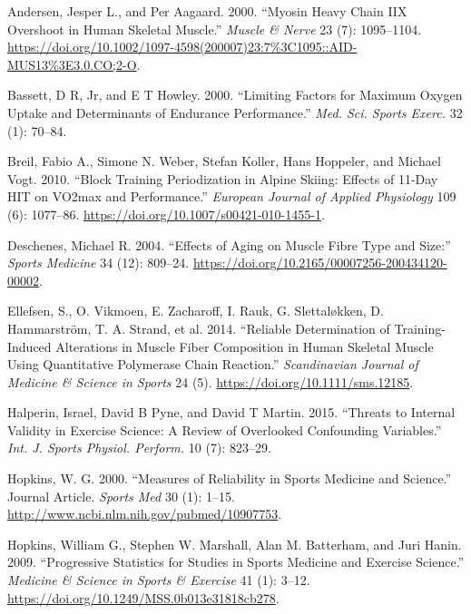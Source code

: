 \documentclass[
  letterpaper,
  DIV=11,
  numbers=noendperiod]{scrreprt}
\newlength{\cslhangindent}
\newenvironment{CSLReferences}[2] %
 {\begin{list}{}{%
  \setlength{\itemindent}{0pt}
  \setlength{\leftmargin}{0pt}
  \setlength{\parsep}{0pt}
  \ifodd #1
   \setlength{\leftmargin}{\cslhangindent}
   \setlength{\itemindent}{-1\cslhangindent}
  \fi
  \setlength{\itemsep}{#2\baselineskip}}}
 {\end{list}}
\begin{document}
\label{refs}
\begin{CSLReferences}{1}{0}
Andersen, Jesper L., and Per Aagaard. 2000. {``Myosin Heavy Chain IIX
Overshoot in Human Skeletal Muscle.''} \emph{Muscle \& Nerve} 23 (7):
1095--1104.
\url{https://doi.org/10.1002/1097-4598(200007)23:7\%3C1095::AID-MUS13\%3E3.0.CO;2-O}.

Bassett, D R, Jr, and E T Howley. 2000. {``Limiting Factors for Maximum
Oxygen Uptake and Determinants of Endurance Performance.''} \emph{Med.
Sci. Sports Exerc.} 32 (1): 70--84.

Breil, Fabio A., Simone N. Weber, Stefan Koller, Hans Hoppeler, and
Michael Vogt. 2010. {``Block Training Periodization in Alpine Skiing:
Effects of 11-Day HIT on VO2max and Performance.''} \emph{European
Journal of Applied Physiology} 109 (6): 1077--86.
\url{https://doi.org/10.1007/s00421-010-1455-1}.

Deschenes, Michael R. 2004. {``Effects of Aging on Muscle Fibre Type and
Size:''} \emph{Sports Medicine} 34 (12): 809--24.
\url{https://doi.org/10.2165/00007256-200434120-00002}.

Ellefsen, S., O. Vikmoen, E. Zacharoff, I. Rauk, G. Slettaløkken, D.
Hammarström, T. A. Strand, et al. 2014. {``Reliable Determination of
Training{-}Induced Alterations in Muscle Fiber Composition in Human
Skeletal Muscle Using Quantitative Polymerase Chain Reaction.''}
\emph{Scandinavian Journal of Medicine \& Science in Sports} 24 (5).
\url{https://doi.org/10.1111/sms.12185}.

Halperin, Israel, David B Pyne, and David T Martin. 2015. {``Threats to
Internal Validity in Exercise Science: A Review of Overlooked
Confounding Variables.''} \emph{Int. J. Sports Physiol. Perform.} 10
(7): 823--29.

Hopkins, W. G. 2000. {``Measures of Reliability in Sports Medicine and
Science.''} Journal Article. \emph{Sports Med} 30 (1): 1--15.
\url{http://www.ncbi.nlm.nih.gov/pubmed/10907753}.

Hopkins, William G., Stephen W. Marshall, Alan M. Batterham, and Juri
Hanin. 2009. {``Progressive Statistics for Studies in Sports Medicine
and Exercise Science.''} \emph{Medicine \& Science in Sports \&
Exercise} 41 (1): 3--12.
\url{https://doi.org/10.1249/MSS.0b013e31818cb278}.


\end{CSLReferences}
\end{document}
